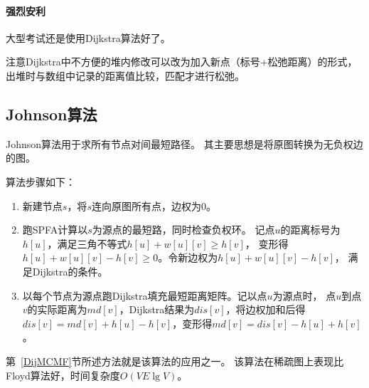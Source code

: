 \paragraph{强烈安利}
大型考试还是使用Dijkstra算法好了。

注意Dijkstra中不方便的堆内修改可以改为加入新点（标号+松弛距离）的形式，
出堆时与数组中记录的距离值比较，匹配才进行松弛。
\subsection{Johnson算法}
Johnson算法用于求所有节点对间最短路径。
其主要思想是将原图转换为无负权边的图。

算法步骤如下：
\begin{enumerate}
    \item 新建节点$s$，将$s$连向原图所有点，边权为0。
    \item 跑SPFA计算以$s$为源点的最短路，同时检查负权环。
    记点$u$的距离标号为$h[u]$，满足三角不等式$h[u]+w[u][v]\geq h[v]$，
    变形得$h[u]+w[u][v]-h[v]\geq 0$。令新边权为$h[u]+w[u][v]-h[v]$，
    满足Dijkstra的条件。
    \item 以每个节点为源点跑Dijkstra填充最短距离矩阵。记以点$u$为源点时，
    点$u$到点$v$的实际距离为$md[v]$，Dijkstra结果为$dis[v]$，将边权加和后得
    $dis[v]=md[v]+h[u]-h[v]$，变形得$md[v]=dis[v]-h[u]+h[v]$。
\end{enumerate}

第~\ref{DijMCMF}节所述方法就是该算法的应用之一。
该算法在稀疏图上表现比Floyd算法好，时间复杂度$O(VE\lg V)$。
